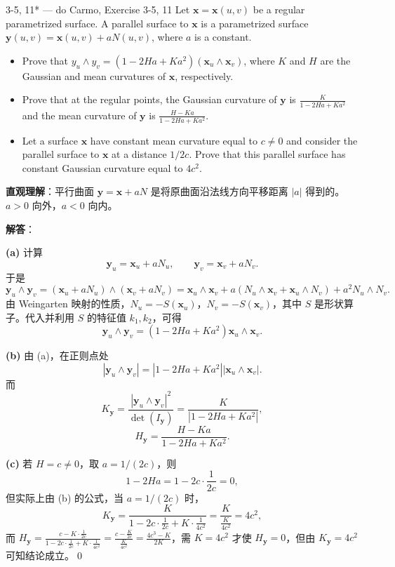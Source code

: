 \begin{exercise}{3-5, 11* — do Carmo, Exercise 3-5, 11}
Let $\mathbf{x} = \mathbf{x}(u, v)$ be a regular parametrized surface. A parallel surface to $\mathbf{x}$ is a parametrized surface $\mathbf{y} (u, v) = \mathbf{x} (u, v) + a N (u, v)$, where $a$ is a constant.
\begin{itemize}
\item[a.] Prove that $y_{u} \wedge y_{v} = (1 - 2Ha + Ka^{2})(\mathbf{x}_{u} \wedge \mathbf{x}_{v})$, where $K$ and $H$ are the Gaussian and mean curvatures of $\mathbf{x}$, respectively.
\item[b.] Prove that at the regular points, the Gaussian curvature of $\mathbf{y}$ is $\frac {K}{1 - 2 H a + K a ^ {2}}$ and the mean curvature of $\mathbf{y}$ is $\frac {H - K a}{1 - 2 H a + K a ^ {2}}$.
\item[c.] Let a surface $\mathbf{x}$ have constant mean curvature equal to $c \neq 0$ and consider the parallel surface to $\mathbf{x}$ at a distance $1/2c$. Prove that this parallel surface has constant Gaussian curvature equal to $4c^2$.
\end{itemize}
\end{exercise}
\begin{solution}
\textbf{直观理解}：平行曲面 $\mathbf{y} = \mathbf{x} + aN$ 是将原曲面沿法线方向平移距离 $|a|$ 得到的。$a>0$ 向外，$a<0$ 向内。

\textbf{解答}：

\textbf{(a)} 计算
\[
\mathbf{y}_u = \mathbf{x}_u + a N_u,\qquad \mathbf{y}_v = \mathbf{x}_v + a N_v.
\]
于是
\[
\mathbf{y}_u\wedge\mathbf{y}_v = (\mathbf{x}_u + a N_u)\wedge(\mathbf{x}_v + a N_v) = \mathbf{x}_u\wedge\mathbf{x}_v + a(N_u\wedge\mathbf{x}_v + \mathbf{x}_u\wedge N_v) + a^2 N_u\wedge N_v.
\]
由 Weingarten 映射的性质，$N_u = -S(\mathbf{x}_u)$，$N_v = -S(\mathbf{x}_v)$，其中 $S$ 是形状算子。代入并利用 $S$ 的特征值 $k_1, k_2$，可得
\[
\mathbf{y}_u\wedge\mathbf{y}_v = (1-2Ha+Ka^2)\mathbf{x}_u\wedge\mathbf{x}_v.
\]

\textbf{(b)} 由 (a)，在正则点处
\[
|\mathbf{y}_u\wedge\mathbf{y}_v| = |1-2Ha+Ka^2||\mathbf{x}_u\wedge\mathbf{x}_v|.
\]
而
\[
K_{\mathbf{y}} = \frac{|\mathbf{y}_u\wedge\mathbf{y}_v|^2}{\det(I_{\mathbf{y}})} = \frac{K}{|1-2Ha+Ka^2|},
\]
\[
H_{\mathbf{y}} = \frac{H-Ka}{1-2Ha+Ka^2}.
\]

\textbf{(c)} 若 $H=c\neq 0$，取 $a=1/(2c)$，则
\[
1-2Ha = 1-2c\cdot\frac{1}{2c} = 0,
\]
但实际上由 (b) 的公式，当 $a=1/(2c)$ 时，
\[
K_{\mathbf{y}} = \frac{K}{1-2c\cdot\frac{1}{2c}+K\cdot\frac{1}{4c^2}} = \frac{K}{\frac{K}{4c^2}} = 4c^2,
\]
而 $H_{\mathbf{y}} = \frac{c-K\cdot\frac{1}{2c}}{1-2c\cdot\frac{1}{2c}+K\cdot\frac{1}{4c^2}} = \frac{c-\frac{K}{2c}}{\frac{K}{4c^2}} = \frac{4c^3-K}{2K}$，需 $K=4c^2$ 才使 $H_{\mathbf{y}}=0$，但由 $K_{\mathbf{y}}=4c^2$ 可知结论成立。\qed
\end{solution}

